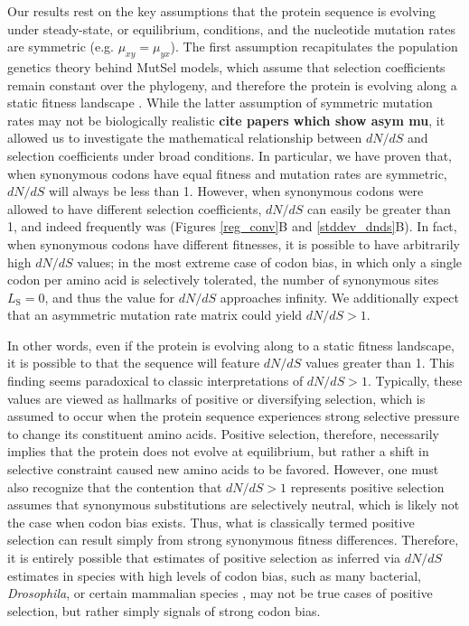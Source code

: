 \documentclass[11pt]{article}
\begin{document}
Our results rest on the key assumptions that the protein sequence is evolving under steady-state, or equilibrium, conditions, and the nucleotide mutation rates are symmetric (e.g. $\mu_{xy} = \mu_{yx}$). The first assumption recapitulates the population genetics theory behind MutSel models, which assume that selection coefficients remain constant over the phylogeny, and therefore the protein is evolving along a static fitness landscape \cite{HalpernBruno1998,Rodrigueetal2010,Tamurietal2012}. While the latter assumption of symmetric mutation rates may not be biologically realistic \textbf{cite papers which show asym mu}, it allowed us to investigate the mathematical relationship between $dN/dS$ and selection coefficients under broad conditions. In particular, we have proven that, when synonymous codons have equal fitness and mutation rates are symmetric, $dN/dS$ will always be less than 1. However, when synonymous codons were allowed to have different selection coefficients, $dN/dS$ can easily be greater than 1, and indeed frequently was (Figures \ref{reg_conv}B and \ref{stddev_dnds}B). In fact, when synonymous codons have different fitnesses, it is possible to have arbitrarily high $dN/dS$ values; in the most extreme case of codon bias, in which only a single codon per amino acid is selectively tolerated, the number of synonymous sites $L_\text{S} = 0$, and thus the value for $dN/dS$ approaches infinity. We additionally expect that an asymmetric mutation rate matrix could yield $dN/dS > 1$.

In other words, even if the protein is evolving along to a static fitness landscape, it is possible to that the sequence will feature $dN/dS$ values greater than 1. This finding seems paradoxical to classic interpretations of $dN/dS >1$. Typically, these values are viewed as hallmarks of positive or diversifying selection, which is assumed to occur when the protein sequence experiences strong selective pressure to change its constituent amino acids. Positive selection, therefore, necessarily implies that the protein does not evolve at equilibrium, but rather a shift in selective constraint caused new amino acids to be favored. However, one must also recognize that the contention that $dN/dS > 1$ represents positive selection assumes that synonymous substitutions are selectively neutral, which is likely not the case when codon bias exists. Thus, what is classically termed positive selection can result simply from strong synonymous fitness differences. Therefore, it is entirely possible that estimates of positive selection as inferred via $dN/dS$ estimates in species with high levels of codon bias, such as many bacterial, \textit{Drosophila}, or certain mammalian species \cite{Duret2002, Chamaryetal2006, HershbergPetrov2008, PlotkinKudla2010}, may not be true cases of positive selection, but rather simply signals of strong codon bias.
\end{document}
